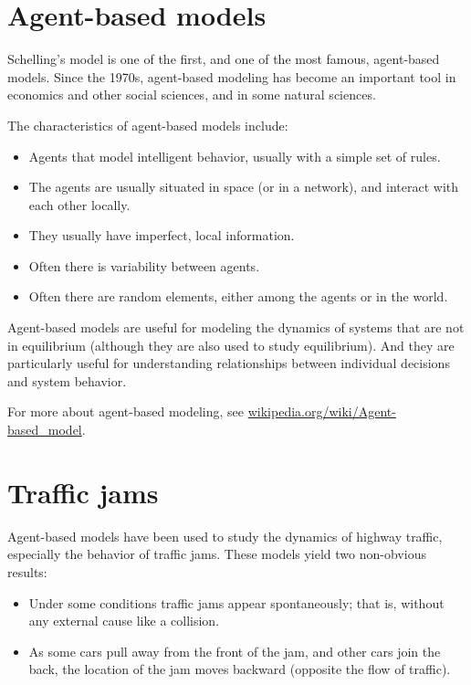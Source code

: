 \documentclass[10pt]{book}
\begin{document}
\section{Agent-based models}

Schelling's model is one of the first, and one of the most
famous, agent-based models.  Since the 1970s, agent-based
modeling has become an important tool in economics and other
social sciences, and in some natural sciences.

The characteristics of agent-based models include:

\begin{itemize}

\item Agents that model intelligent behavior, usually with a simple
  set of rules.

\item The agents are usually situated in space (or in a network), and
  interact with each other locally.

\item They usually have imperfect, local information.

\item Often there is variability between agents.

\item Often there are random elements, either among the agents or in
  the world.

\end{itemize}

Agent-based models are useful for modeling the dynamics
of systems that are not in equilibrium (although they are also
used to study equilibrium).  And they are particularly useful for
understanding relationships between individual decisions and
system behavior.

For more about agent-based modeling, see
\url{wikipedia.org/wiki/Agent-based_model}.


\section{Traffic jams}

Agent-based models have been used to study the
dynamics of highway traffic, especially the behavior of traffic
jams.  These models yield two non-obvious
results:

\begin{itemize}

\item Under some conditions traffic jams appear spontaneously;
that is, without any external cause like a collision.

\item As some cars pull away from the front of the
jam, and other cars join the back,  the location of the jam
moves backward (opposite the flow of traffic).

\end{itemize}
\end{document}
